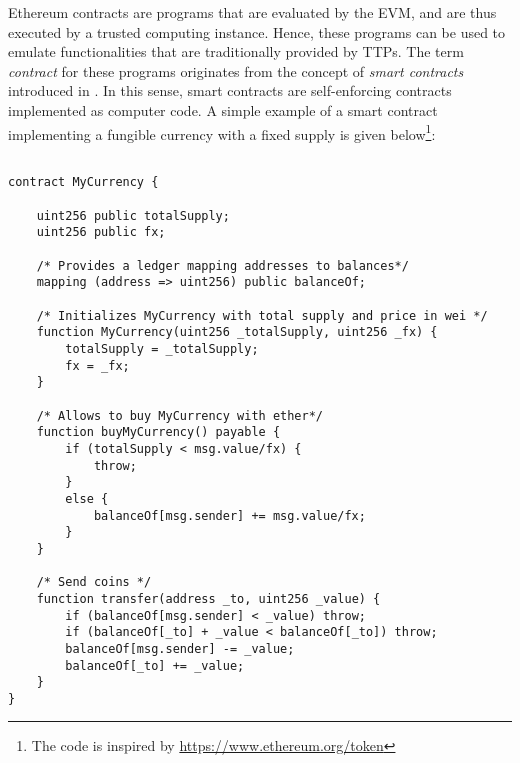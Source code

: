 Ethereum contracts are programs that are evaluated by the \ac{EVM}, and are thus executed by a trusted computing instance. Hence, these programs can be used to emulate functionalities that are traditionally provided by \ac{TTP}s. The term \emph{contract} for these programs originates from the concept of \emph{smart contracts} introduced in \parencite{szabo1997}. In this sense, smart contracts are self-enforcing contracts implemented as computer code. A simple example of a smart contract implementing a fungible currency with a fixed supply is given below\footnote{The code is inspired by \url{https://www.ethereum.org/token}}:

\begin{verbatim}
 
contract MyCurrency {
  
    uint256 public totalSupply;
    uint256 public fx;

    /* Provides a ledger mapping addresses to balances*/
    mapping (address => uint256) public balanceOf;
  
    /* Initializes MyCurrency with total supply and price in wei */
    function MyCurrency(uint256 _totalSupply, uint256 _fx) {
        totalSupply = _totalSupply; 
        fx = _fx;
    }
    
    /* Allows to buy MyCurrency with ether*/
    function buyMyCurrency() payable {
        if (totalSupply < msg.value/fx) {
            throw;
        }
        else {
            balanceOf[msg.sender] += msg.value/fx;     
        }       
    }

    /* Send coins */
    function transfer(address _to, uint256 _value) {
        if (balanceOf[msg.sender] < _value) throw;           
        if (balanceOf[_to] + _value < balanceOf[_to]) throw;
        balanceOf[msg.sender] -= _value;   
        balanceOf[_to] += _value;                            
    }
}
\end{verbatim}

